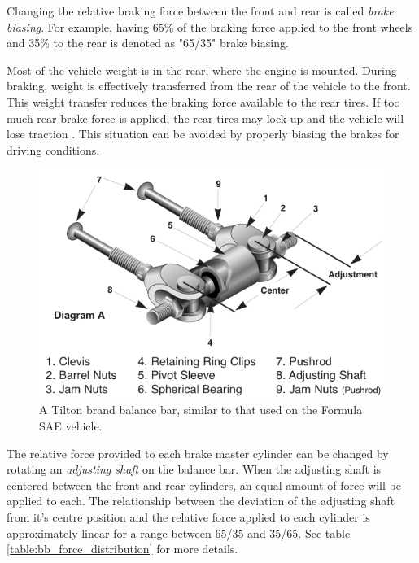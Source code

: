 Changing the relative braking force between the front and rear is called \emph{brake biasing}. For example, having 65\% of the braking force applied to the front wheels and 35\% to the rear is denoted as "65/35" brake biasing. 

Most of the vehicle weight is in the rear, where the engine is mounted. During braking, weight is effectively transferred from the rear of the vehicle to the front. This weight transfer reduces the braking force available to the rear tires. If too much rear brake force is applied, the rear tires may lock-up and the vehicle will lose traction \cite{FundVehicleDynamics}. This situation can be avoided by properly biasing the brakes for driving conditions.

\begin{figure}[h!]
	\centering
	 	\includegraphics[scale=1.0]{figures/balance_bar_diag.png}
    \caption{A Tilton brand balance bar, similar to that used on the Formula SAE vehicle.}
    \label{fig:balance_bar_diag}
\end{figure}

The relative force provided to each brake master cylinder can be changed by rotating an \emph{adjusting shaft} on the balance bar. When the adjusting shaft is centered between the front and rear cylinders, an equal amount of force will be applied to each. The relationship between the deviation of the adjusting shaft from it's centre position and the relative force applied to each cylinder is approximately linear for a range between 65/35 and 35/65. See table \ref{table:bb_force_distribution} for more details.

